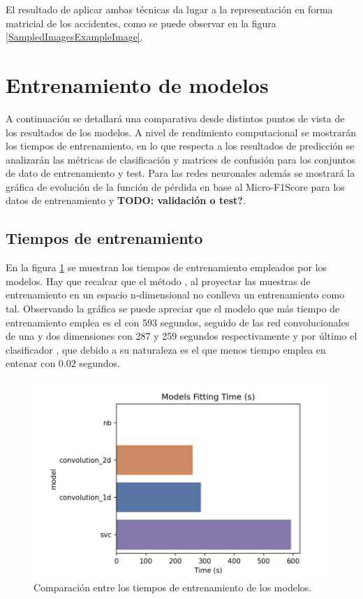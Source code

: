   El resultado de aplicar ambas técnicas da lugar a la representación en forma matricial de los accidentes, como se puede observar en la figura \ref{SampledImagesExampleImage}.



\section{Entrenamiento de modelos}

  A continuación se detallará una comparativa desde distintos puntos de vista de los resultados de los modelos. A nivel de rendimiento computacional se mostrarán los tiempos de entrenamiento, en lo que respecta a los resultados de predicción se analizarán las métricas de clasificación y matrices de confusión para los conjuntos de dato de entrenamiento y test. Para las redes neuronales además se mostrará la gráfica de evolución de la función de pérdida en base al Micro-F1Score para los datos de entrenamiento y \textbf{TODO: validación o test?}.

  \subsection{Tiempos de entrenamiento}

    En la figura \ref{TiemposEntrenamientoImage} se muestran los tiempos de entrenamiento empleados por los modelos. Hay que recalcar que el método , al proyectar las muestras de entrenamiento en un espacio n-dimensional no conlleva un entrenamiento como tal. Observando la gráfica se puede apreciar que el modelo que más tiempo de entrenamiento emplea es el  con 593 segundos, seguido de las red convolucionales de una y dos dimensiones con 287 y 259 segundos respectivamente y por último el clasificador  , que debido a su naturaleza es el que menos tiempo emplea en entenar con 0.02 segundos. 


    \begin{figure}[h]
      \centering
      \includegraphics[width=12cm]{archivos/5.Resultados/TiemposEntrenamiento}
      \caption{Comparación entre los tiempos de entrenamiento de los modelos.}
      \label{TiemposEntrenamientoImage}
    \end{figure}


